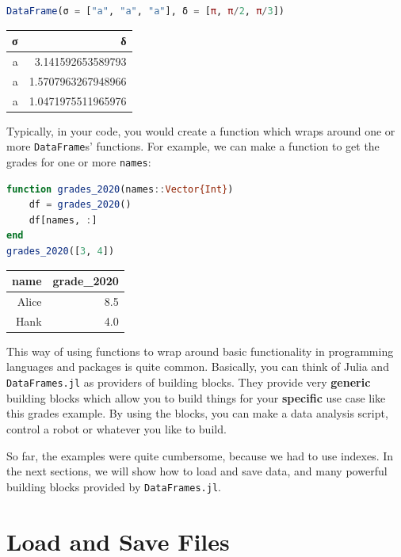 \documentclass[
  notoc %
]{tufte-book}
\newcommand{\passthrough}[1]{#1}
\begin{document}
\begin{lstlisting}[language=Julia]
DataFrame(σ = ["a", "a", "a"], δ = [π, π/2, π/3])
\end{lstlisting}

\begin{longtable}[]{@{}rr@{}}
\toprule
σ & δ \\
\midrule
\endhead
a & 3.141592653589793 \\
a & 1.5707963267948966 \\
a & 1.0471975511965976 \\
\bottomrule
\end{longtable}

Typically, in your code, you would create a function which wraps around
one or more \passthrough{\lstinline!DataFrame!}s' functions. For
example, we can make a function to get the grades for one or more
\passthrough{\lstinline!names!}:

\begin{lstlisting}[language=Julia]
function grades_2020(names::Vector{Int})
    df = grades_2020()
    df[names, :]
end
grades_2020([3, 4])
\end{lstlisting}

\begin{longtable}[]{@{}rr@{}}
\toprule
name & grade\_2020 \\
\midrule
\endhead
Alice & 8.5 \\
Hank & 4.0 \\
\bottomrule
\end{longtable}

This way of using functions to wrap around basic functionality in
programming languages and packages is quite common. Basically, you can
think of Julia and \passthrough{\lstinline!DataFrames.jl!} as providers
of building blocks. They provide very \textbf{generic} building blocks
which allow you to build things for your \textbf{specific} use case like
this grades example. By using the blocks, you can make a data analysis
script, control a robot or whatever you like to build.

So far, the examples were quite cumbersome, because we had to use
indexes. In the next sections, we will show how to load and save data,
and many powerful building blocks provided by
\passthrough{\lstinline!DataFrames.jl!}.

\hypertarget{sec:load_save}{%
\section{Load and Save Files}\label{sec:load_save}}
\end{document}
